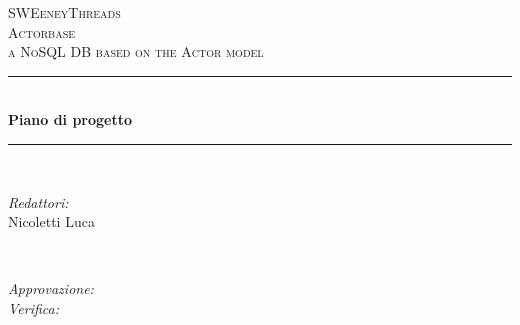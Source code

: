 \documentclass[a4paper]{article}
\begin{document}
	\begin{titlepage}
		\newcommand{\HRule}{\rule{\linewidth}{0.5mm}} 
		\center  
		
		\textsc{\LARGE SWEeneyThreads}\\[1.5cm] 
		\textsc{\Large Actorbase}\\[0.5cm] 
		\textsc{\large a NoSQL DB based on the Actor model}\\[0.5cm]
		
		
		\HRule \\[0.4cm]
		{ \huge \bfseries Piano di progetto}\\[0.4cm] 
		\HRule \\[1.5cm]
		
		\begin{minipage}{0.4\textwidth}
			\begin{flushleft} \large
				\emph{Redattori:}\\
				Nicoletti Luca\\
			\end{flushleft}
		\end{minipage}
		~
		\begin{minipage}{0.4\textwidth}
			\begin{flushright} \large
				\emph{Approvazione:} \\
				\emph{Verifica:} \\
			\end{flushright}
		\end{minipage}
		

\end{titlepage}
\end{document}
